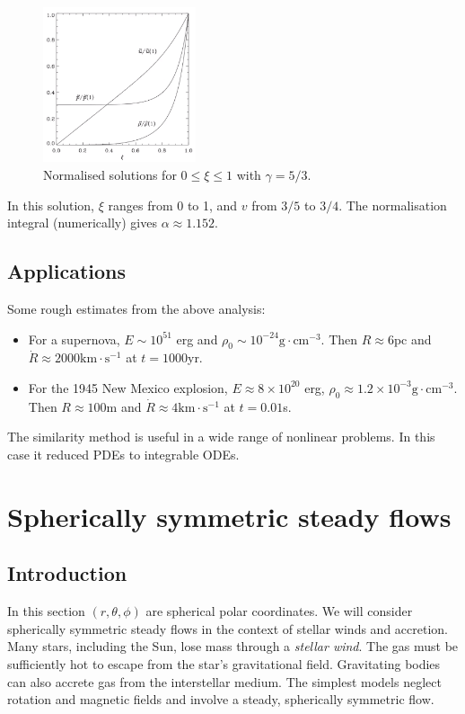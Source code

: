 \documentclass{jknotes}
\begin{document}
\begin{figure}[h]
	\centering
	\includegraphics[width=0.4\textwidth]{supernova.png}
	\caption{Normalised solutions for $0 \le \xi \le 1$ with $\gamma =5/3$.}
\end{figure}
In this solution, $\xi$ ranges from 0 to 1, and $v$ from $3/5$ to $3/4$. The
normalisation integral (numerically) gives $\alpha \approx 1.152$.

\subsection{Applications}
Some rough estimates from the above analysis:
\begin{itemize}
	\item For a supernova, $E \sim 10^{51}$ erg and $\rho_0 \sim 10^{-24}
		\text{g}\cdot\text{cm}^{-3}$. Then $R \approx 6$pc and $\dot{R} \approx
		2000 \text{km}\cdot\text{s}^{-1}$ at $t=1000$yr.
	\item For the 1945 New Mexico explosion, $E \approx 8 \times 10^{20}$ erg,
		$\rho_0 \approx 1.2 \times 10^{-3} \text{g}\cdot\text{cm}^{-3}$. Then
		$R \approx 100$m and $\dot{R} \approx 4 \text{km}\cdot\text{s}^{-1}$
		at $t=0.01$s.
\end{itemize}

The similarity method is useful in a wide range of nonlinear problems. In this
case it reduced PDEs to integrable ODEs.

\section{Spherically symmetric steady flows}
\subsection{Introduction}
In this section $(r, \theta, \phi)$ are spherical polar coordinates. We will
consider spherically symmetric steady flows in the context of stellar winds
and accretion. Many stars, including the Sun, lose mass through a
\emph{stellar wind}. The gas must be sufficiently hot to escape from the
star's gravitational field.  Gravitating bodies can also accrete gas from the
interstellar medium. The simplest models neglect rotation and magnetic fields
and involve a steady, spherically symmetric flow.
\end{document}
